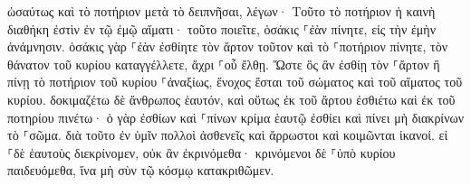 \documentclass{openreader}
\begin{document}
ὡσαύτως καὶ τὸ ποτήριον μετὰ τὸ δειπνῆσαι, λέγων· Τοῦτο τὸ ποτήριον ἡ καινὴ διαθήκη ἐστὶν ἐν τῷ ἐμῷ αἵματι· τοῦτο ποιεῖτε, ὁσάκις ⸀ἐὰν πίνητε, εἰς τὴν ἐμὴν ἀνάμνησιν. 
ὁσάκις γὰρ ⸀ἐὰν ἐσθίητε τὸν ἄρτον τοῦτον καὶ τὸ ⸀ποτήριον πίνητε, τὸν θάνατον τοῦ κυρίου καταγγέλλετε, ἄχρι ⸀οὗ ἔλθῃ. 
Ὥστε ὃς ἂν ἐσθίῃ τὸν ⸀ἄρτον ἢ πίνῃ τὸ ποτήριον τοῦ κυρίου ⸀ἀναξίως, ἔνοχος ἔσται τοῦ σώματος καὶ τοῦ αἵματος τοῦ κυρίου. 
δοκιμαζέτω δὲ ἄνθρωπος ἑαυτόν, καὶ οὕτως ἐκ τοῦ ἄρτου ἐσθιέτω καὶ ἐκ τοῦ ποτηρίου πινέτω· 
ὁ γὰρ ἐσθίων καὶ ⸀πίνων κρίμα ἑαυτῷ ἐσθίει καὶ πίνει μὴ διακρίνων τὸ ⸀σῶμα. 
διὰ τοῦτο ἐν ὑμῖν πολλοὶ ἀσθενεῖς καὶ ἄρρωστοι καὶ κοιμῶνται ἱκανοί. 
εἰ ⸀δὲ ἑαυτοὺς διεκρίνομεν, οὐκ ἂν ἐκρινόμεθα· 
κρινόμενοι δὲ ⸀ὑπὸ κυρίου παιδευόμεθα, ἵνα μὴ σὺν τῷ κόσμῳ κατακριθῶμεν. 
\end{document}
